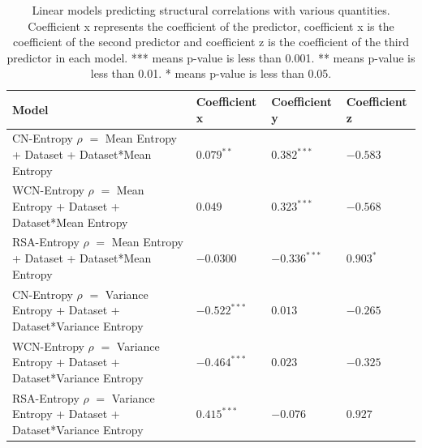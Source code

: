 \documentclass[12pt]{article}
\begin{document}
\begin{center}
	\begin{table}[H]
	\begin{tabular}{ | p{5.0cm} | p{3cm} | p{3cm} | p{3cm} | }
	\hline
	Model & Coefficient x  & Coefficient y & Coefficient z \\	
	\hline
	CN-Entropy $\rho$ $ = $ Mean Entropy + Dataset + Dataset*Mean Entropy & $0.079 ^{**}$ & $0.382^{***}$  & $-0.583$ \\	
	\hline
	WCN-Entropy $\rho$ $ = $ Mean Entropy + Dataset + Dataset*Mean Entropy & $0.049$ & $0.323^{***}$ & $-0.568$  \\	
	\hline

	RSA-Entropy $\rho$ $ = $ Mean Entropy + Dataset + Dataset*Mean Entropy &  $-0.0300$ & $-0.336^{***}$ & $0.903^{*}$ \\	

	\hline
	CN-Entropy $\rho$ $ = $ Variance Entropy + Dataset + Dataset*Variance Entropy & $-0.522^{***}$ &  $0.013$ & $-0.265$ \\	
	\hline
	WCN-Entropy $\rho$ $ = $ Variance Entropy + Dataset + Dataset*Variance Entropy & $-0.464^{***}$ &  $0.023$ & $-0.325$ \\	
	\hline
	RSA-Entropy $\rho$ $ = $ Variance Entropy + Dataset + Dataset*Variance Entropy & $0.415^{***}$ & $-0.076$ & $0.927$ \\	

	\hline
	\end{tabular}
	\caption{Linear models predicting structural correlations with various quantities. Coefficient x represents the coefficient of the predictor, coefficient x is the coefficient of the second predictor and coefficient z is the coefficient of the third predictor in each model.  *** means p-value is less than 0.001. ** means p-value is less than 0.01.  * means p-value is less than 0.05. }
	\label{table:model_stats}
	\end{table}
\end{center}
\end{document}
